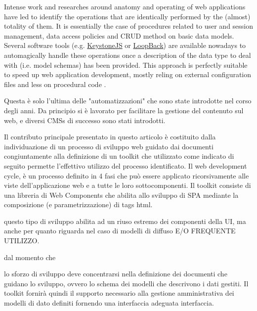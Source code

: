 







Intense work and researches around anatomy and operating of web applications have led to identify the operations that are identically performed by the (almost) totality of them. It is essentially the case of procedures related to user and session management, data access policies and CRUD method on basic data models.
Several software tools (e.g. \href{http://keystonejs.com}{KeystoneJS} or \href{http://loopback.io}{LoopBack}) are available nowadays to automagically handle these operations once a description of the data type to deal with (i.e. model schemas) has been provided. This approach is perfectly suitable to speed up web application development, mostly reling on external configuration files and less on procedural code \cite{6859693}.

Questa è solo l'ultima delle "automatizzazioni" che sono state introdotte nel corso degli anni. Da principio si è lavorato per facilitare la gestione del contenuto sul web, e diversi CMSs di successo sono stati introdotti. 






Il contributo principale presentato in questo articolo è costituito dalla individuazione di un processo di sviluppo web guidato dai documenti congiuntamente alla definizione di un toolkit che utilizzato come indicato di seguito permette l'effettivo utilizzo del processo identificato. Il web development cycle, è un processo definito in 4 fasi che può essere applicato ricorsivamente alle viste dell'applicazione web e a tutte le loro sottocomponenti. Il toolkit consiste di una libreria di Web Components che abilita allo sviluppo di SPA mediante la composizione (e parametrizzazione) di tags html.

questo tipo di sviluppo abilita ad un riuso estremo dei componenti della UI, ma anche per quanto riguarda nel caso di modelli di diffuso E/O FREQUENTE UTILIZZO.


dal momento che 


lo sforzo di sviluppo deve concentrarsi nella definizione dei documenti che guidano lo sviluppo, ovvero lo schema dei modelli che descrivono i dati gestiti. Il toolkit fornirà quindi il supporto necessario alla gestione amministrativa dei modelli di dato definiti fornendo una interfaccia adeguata interfaccia.











